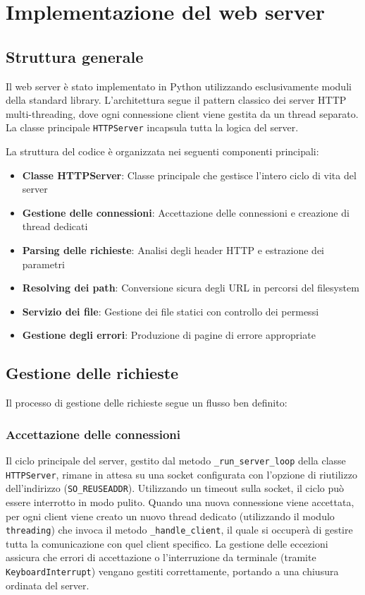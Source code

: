 \documentclass[a4paper,12pt]{report}
\begin{document}
\chapter{Implementazione del web server}
\section{Struttura generale}

Il web server è stato implementato in Python utilizzando esclusivamente moduli della standard library. L'architettura segue il pattern classico dei server HTTP multi-threading, dove ogni connessione client viene gestita da un thread separato. La classe principale \texttt{HTTPServer} incapsula tutta la logica del server.

La struttura del codice è organizzata nei seguenti componenti principali:

\begin{itemize}
    \item \textbf{Classe HTTPServer}: Classe principale che gestisce l'intero ciclo di vita del server
    \item \textbf{Gestione delle connessioni}: Accettazione delle connessioni e creazione di thread dedicati
    \item \textbf{Parsing delle richieste}: Analisi degli header HTTP e estrazione dei parametri
    \item \textbf{Resolving dei path}: Conversione sicura degli URL in percorsi del filesystem
    \item \textbf{Servizio dei file}: Gestione dei file statici con controllo dei permessi
    \item \textbf{Gestione degli errori}: Produzione di pagine di errore appropriate
\end{itemize}

\section{Gestione delle richieste}

Il processo di gestione delle richieste segue un flusso ben definito:

\subsection{Accettazione delle connessioni}
Il ciclo principale del server, gestito dal metodo \texttt{\_run\_server\_loop} della classe \texttt{HTTPServer}, rimane in attesa su una socket configurata con l'opzione di riutilizzo dell'indirizzo (\texttt{SO\_REUSEADDR}). Utilizzando un timeout sulla socket, il ciclo può essere interrotto in modo pulito. Quando una nuova connessione viene accettata, per ogni client viene creato un nuovo thread dedicato (utilizzando il modulo \texttt{threading}) che invoca il metodo \texttt{\_handle\_client}, il quale si occuperà di gestire tutta la comunicazione con quel client specifico. La gestione delle eccezioni assicura che errori di accettazione o l'interruzione da terminale (tramite \texttt{KeyboardInterrupt}) vengano gestiti correttamente, portando a una chiusura ordinata del server.
\end{document}
